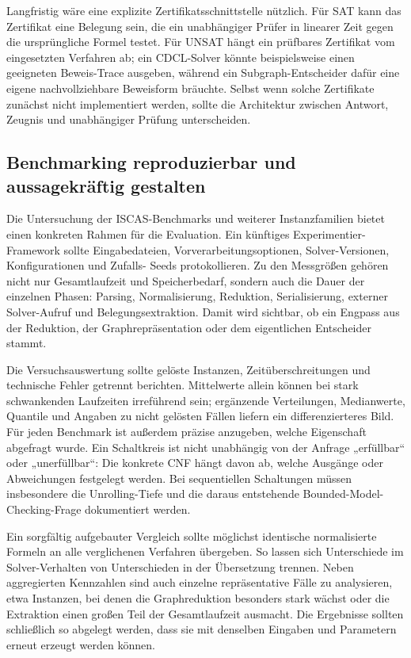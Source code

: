 \documentclass[a4paper,12pt]{article}
\theoremstyle{definition}
\begin{document}
Langfristig wäre eine explizite Zertifikatsschnittstelle nützlich. Für SAT kann das Zertifikat eine Belegung sein, die ein unabhängiger Prüfer in linearer Zeit gegen die ursprüngliche Formel testet. Für UNSAT hängt ein prüfbares Zertifikat vom eingesetzten Verfahren ab; ein CDCL-Solver könnte beispielsweise einen geeigneten Beweis-Trace ausgeben, während ein Subgraph-Entscheider dafür eine eigene nachvollziehbare Beweisform bräuchte. Selbst wenn solche Zertifikate zunächst nicht implementiert werden, sollte die Architektur zwischen Antwort, Zeugnis und unabhängiger Prüfung unterscheiden.

\subsection{Benchmarking reproduzierbar und aussagekräftig gestalten}
Die Untersuchung der ISCAS-Benchmarks und weiterer Instanzfamilien bietet einen konkreten Rahmen für die Evaluation. Ein künftiges Experimentier-Framework sollte Eingabedateien, Vorverarbeitungsoptionen, Solver-Versionen, Konfigurationen und Zufalls- Seeds protokollieren. Zu den Messgrößen gehören nicht nur Gesamtlaufzeit und Speicherbedarf, sondern auch die Dauer der einzelnen Phasen: Parsing, Normalisierung, Reduktion, Serialisierung, externer Solver-Aufruf und Belegungsextraktion. Damit wird sichtbar, ob ein Engpass aus der Reduktion, der Graphrepräsentation oder dem eigentlichen Entscheider stammt.

Die Versuchsauswertung sollte gelöste Instanzen, Zeitüberschreitungen und technische Fehler getrennt berichten. Mittelwerte allein können bei stark schwankenden Laufzeiten irreführend sein; ergänzende Verteilungen, Medianwerte, Quantile und Angaben zu nicht gelösten Fällen liefern ein differenzierteres Bild. Für jeden Benchmark ist außerdem präzise anzugeben, welche Eigenschaft abgefragt wurde. Ein Schaltkreis ist nicht unabhängig von der Anfrage „erfüllbar“ oder „unerfüllbar“: Die konkrete CNF hängt davon ab, welche Ausgänge oder Abweichungen festgelegt werden. Bei sequentiellen Schaltungen müssen insbesondere die Unrolling-Tiefe und die daraus entstehende Bounded-Model-Checking-Frage dokumentiert werden.

Ein sorgfältig aufgebauter Vergleich sollte möglichst identische normalisierte Formeln an alle verglichenen Verfahren übergeben. So lassen sich Unterschiede im Solver-Verhalten von Unterschieden in der Übersetzung trennen. Neben aggregierten Kennzahlen sind auch einzelne repräsentative Fälle zu analysieren, etwa Instanzen, bei denen die Graphreduktion besonders stark wächst oder die Extraktion einen großen Teil der Gesamtlaufzeit ausmacht. Die Ergebnisse sollten schließlich so abgelegt werden, dass sie mit denselben Eingaben und Parametern erneut erzeugt werden können.
\end{document}

